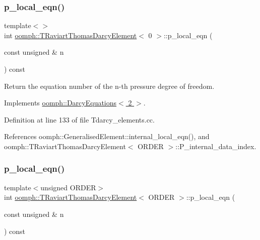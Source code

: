 \subsubsection{\texorpdfstring{p\+\_\+local\+\_\+eqn()}{p\_local\_eqn()}\hspace{0.1cm}{\footnotesize\ttfamily [1/3]}}
{\footnotesize\ttfamily template$<$$>$ \\
int \hyperlink{classoomph_1_1TRaviartThomasDarcyElement}{oomph\+::\+T\+Raviart\+Thomas\+Darcy\+Element}$<$ 0 $>$\+::p\+\_\+local\+\_\+eqn (\begin{DoxyParamCaption}\item[{const unsigned \&}]{n }\end{DoxyParamCaption}) const\hspace{0.3cm}{\ttfamily [virtual]}}



Return the equation number of the n-\/th pressure degree of freedom. 



Implements \hyperlink{classoomph_1_1DarcyEquations_a3eee8ba9fd2256d01c4be1141a5d6eb1}{oomph\+::\+Darcy\+Equations$<$ 2 $>$}.



Definition at line 133 of file Tdarcy\+\_\+elements.\+cc.



References oomph\+::\+Generalised\+Element\+::internal\+\_\+local\+\_\+eqn(), and oomph\+::\+T\+Raviart\+Thomas\+Darcy\+Element$<$ O\+R\+D\+E\+R $>$\+::\+P\+\_\+internal\+\_\+data\+\_\+index.

\mbox{\label{classoomph_1_1TRaviartThomasDarcyElement_a2ecb4c8ab08c0a21dbbf3afbf1101fbf}} 
\subsubsection{\texorpdfstring{p\+\_\+local\+\_\+eqn()}{p\_local\_eqn()}\hspace{0.1cm}{\footnotesize\ttfamily [2/3]}}
{\footnotesize\ttfamily template$<$unsigned O\+R\+D\+ER$>$ \\
int \hyperlink{classoomph_1_1TRaviartThomasDarcyElement}{oomph\+::\+T\+Raviart\+Thomas\+Darcy\+Element}$<$ O\+R\+D\+ER $>$\+::p\+\_\+local\+\_\+eqn (\begin{DoxyParamCaption}\item[{const unsigned \&}]{n }\end{DoxyParamCaption}) const\hspace{0.3cm}{\ttfamily [virtual]}}



